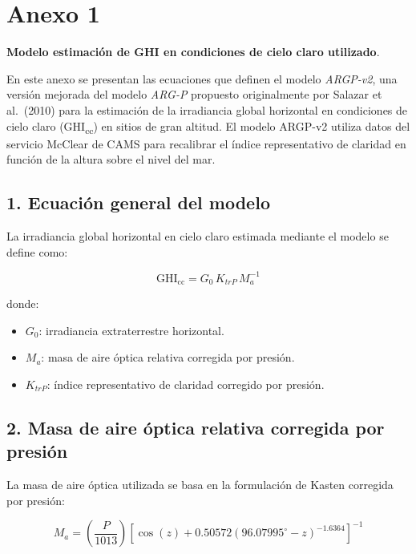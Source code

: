 \rhead{\newtitle}
\cfoot{\thepage}
\renewcommand{\headrulewidth}{1pt}
\renewcommand{\footrulewidth}{1pt}
\chapter*{Anexo 1}


\noindent \textbf{Modelo estimación de GHI en condiciones de cielo claro utilizado}.


En este anexo se presentan las ecuaciones que definen el modelo \textit{ARGP-v2}, una versión 
mejorada del modelo \textit{ARG-P} propuesto originalmente por Salazar et al.~(2010) para la 
estimación de la irradiancia global horizontal en condiciones de cielo claro (GHI\textsubscript{cc}) 
en sitios de gran altitud.  
El modelo ARGP-v2 utiliza datos del servicio McClear de CAMS para recalibrar el índice 
representativo de claridad en función de la altura sobre el nivel del mar.

\section*{1. Ecuación general del modelo}

La irradiancia global horizontal en cielo claro estimada mediante el modelo se define como:

\begin{equation}
\mathrm{GHI_{cc}} = G_0 \, K_{trP} \, M_a^{-1}
\label{eq:argp_general}
\end{equation}

donde:
\begin{itemize}
  \item $G_0$: irradiancia extraterrestre horizontal.
  \item $M_a$: masa de aire óptica relativa corregida por presión.
  \item $K_{trP}$: índice representativo de claridad corregido por presión.
\end{itemize}

\section*{2. Masa de aire óptica relativa corregida por presión}

La masa de aire óptica utilizada se basa en la formulación de Kasten corregida por presión:

\begin{equation}
M_a = \left( \frac{P}{1013} \right)
\left[
\cos(z) + 0.50572 \left( 96.07995^\circ - z \right)^{-1.6364}
\right]^{-1}
\label{eq:ma_kasten}
\end{equation}

